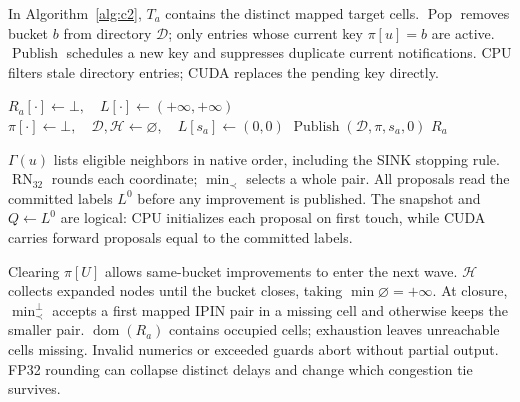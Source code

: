 In Algorithm~\ref{alg:c2}, $T_a$ contains the distinct mapped target cells. $\operatorname{Pop}$ removes bucket $b$ from directory $\mathcal D$; only entries whose current key $\pi[u]=b$ are active. $\operatorname{Publish}$ schedules a new key and suppresses duplicate current notifications. CPU filters stale directory entries; CUDA replaces the pending key directly.

\begin{algorithm}[t]
\caption{Whole-pair FP32 waves (C2)}\label{alg:c2}
$R_a[\cdot]\gets\bot,\quad L[\cdot]\gets(+\infty,+\infty)$\;
$\pi[\cdot]\gets\bot,\quad\mathcal D,\mathcal H\gets\varnothing,\quad L[s_a]\gets(0,0)$\;
$\operatorname{Publish}(\mathcal D,\pi,s_a,0)$\;
\Return $R_a$\;
\end{algorithm}

$\Gamma(u)$ lists eligible neighbors in native order, including the SINK stopping rule. $\operatorname{RN}_{32}$ rounds each coordinate; $\min_{\prec}$ selects a whole pair. All proposals read the committed labels $L^0$ before any improvement is published. The snapshot and $Q\gets L^0$ are logical: CPU initializes each proposal on first touch, while CUDA carries forward proposals equal to the committed labels.

Clearing $\pi[U]$ allows same-bucket improvements to enter the next wave. $\mathcal H$ collects expanded nodes until the bucket closes, taking $\min\varnothing=+\infty$. At closure, $\min_{\prec}^{\bot}$ accepts a first mapped IPIN pair in a missing cell and otherwise keeps the smaller pair. $\operatorname{dom}(R_a)$ contains occupied cells; exhaustion leaves unreachable cells missing. Invalid numerics or exceeded guards abort without partial output. FP32 rounding can collapse distinct delays and change which congestion tie survives.

